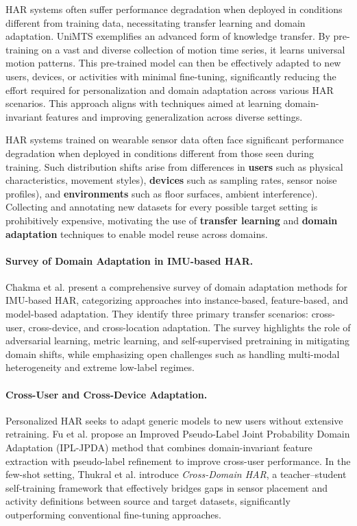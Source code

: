 HAR systems often suffer performance degradation when deployed in conditions different from training data, necessitating transfer learning and domain adaptation. UniMTS \cite{zhang2024unimts} exemplifies an advanced form of knowledge transfer. By pre-training on a vast and diverse collection of motion time series, it learns universal motion patterns. This pre-trained model can then be effectively adapted to new users, devices, or activities with minimal fine-tuning, significantly reducing the effort required for personalization and domain adaptation across various HAR scenarios. This approach aligns with techniques aimed at learning domain-invariant features and improving generalization across diverse settings.

HAR systems trained on wearable sensor data often face significant performance degradation when deployed in conditions different from those seen during training. Such distribution shifts arise from differences in \textbf{users} such as physical characteristics, movement styles), \textbf{devices} such as sampling rates, sensor noise profiles), and \textbf{environments} such as floor surfaces, ambient interference). Collecting and annotating new datasets for every possible target setting is prohibitively expensive, motivating the use of \textbf{transfer learning} and \textbf{domain adaptation} techniques to enable model reuse across domains.

\paragraph{Survey of Domain Adaptation in IMU-based HAR.}
Chakma et al. \cite{chakma2023domain} present a comprehensive survey of domain adaptation methods for IMU-based HAR, categorizing approaches into instance-based, feature-based, and model-based adaptation. They identify three primary transfer scenarios: cross-user, cross-device, and cross-location adaptation. The survey highlights the role of adversarial learning, metric learning, and self-supervised pretraining in mitigating domain shifts, while emphasizing open challenges such as handling multi-modal heterogeneity and extreme low-label regimes.

\paragraph{Cross-User and Cross-Device Adaptation.}
Personalized HAR seeks to adapt generic models to new users without extensive retraining. Fu et al. \cite{fu2021personalized} propose an Improved Pseudo-Label Joint Probability Domain Adaptation (IPL-JPDA) method that combines domain-invariant feature extraction with pseudo-label refinement to improve cross-user performance. In the few-shot setting, Thukral et al. \cite{thukral2025cross} introduce \emph{Cross-Domain HAR}, a teacher–student self-training framework that effectively bridges gaps in sensor placement and activity definitions between source and target datasets, significantly outperforming conventional fine-tuning approaches.

